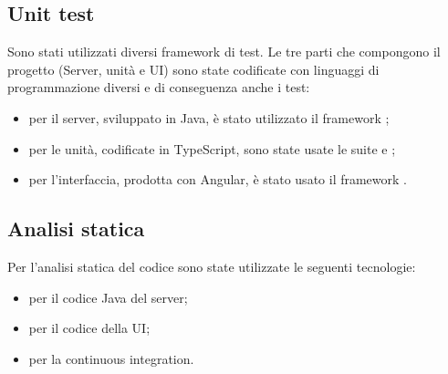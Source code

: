 \subsection{Unit test}
	Sono stati utilizzati diversi framework di test. Le tre parti che compongono il progetto (Server, unità e UI) sono state codificate con linguaggi di programmazione diversi e di conseguenza anche i test:
	\begin{itemize}
		\item per il server, sviluppato in Java, è stato utilizzato il framework ;
		\item per le unità, codificate in TypeScript, sono state usate le suite  e ;
		\item per l'interfaccia, prodotta con Angular, è stato usato il framework .
	\end{itemize}
	
\subsection{Analisi statica}
	Per l'analisi statica del codice sono state utilizzate le seguenti tecnologie:
	\begin{itemize}
		\item {} per il codice Java del server;
		\item {} per il codice della UI;
		\item {} per la continuous integration.
	\end{itemize}